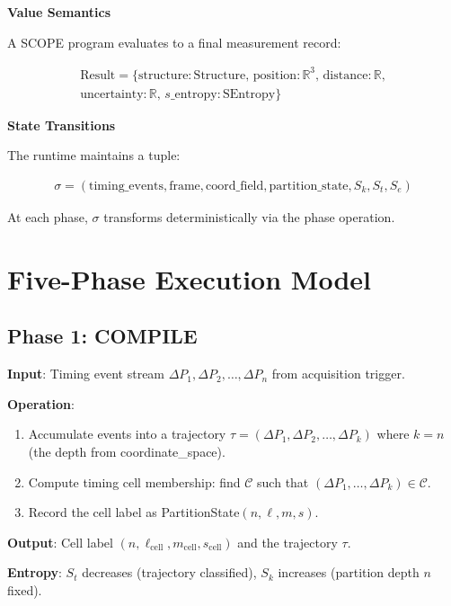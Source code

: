 \documentclass[11pt,twocolumn]{article}
\begin{document}
\textbf{Value Semantics}

A SCOPE program evaluates to a final measurement record:

\begin{align}
\text{Result} = \{\text{structure} : \text{Structure}, \, \text{position} : \mathbb{R}^3, \, \text{distance} : \mathbb{R}, \\
\text{uncertainty} : \mathbb{R}, \, s\_\text{entropy} : \text{SEntropy}\}
\end{align}

\textbf{State Transitions}

The runtime maintains a tuple:

\begin{align}
\sigma = (\text{timing\_events}, \text{frame}, \text{coord\_field}, \text{partition\_state}, S_k, S_t, S_e)
\end{align}

At each phase, $\sigma$ transforms deterministically via the phase operation.

\section{Five-Phase Execution Model}
\label{sec:execution}

\subsection{Phase 1: COMPILE}

\textbf{Input}: Timing event stream $\Delta P_1, \Delta P_2, \ldots, \Delta P_n$ from acquisition trigger.

\textbf{Operation}:
\begin{enumerate}
\item Accumulate events into a trajectory $\tau = (\Delta P_1, \Delta P_2, \ldots, \Delta P_k)$ where $k = n$ (the depth from coordinate\_space).
\item Compute timing cell membership: find $\mathcal{C}$ such that $(\Delta P_1, \ldots, \Delta P_k) \in \mathcal{C}$.
\item Record the cell label as PartitionState$(n, \ell, m, s)$.
\end{enumerate}

\textbf{Output}: Cell label $(n, \ell_{\text{cell}}, m_{\text{cell}}, s_{\text{cell}})$ and the trajectory $\tau$.

\textbf{Entropy}: $S_t$ decreases (trajectory classified), $S_k$ increases (partition depth $n$ fixed).
\end{document}

